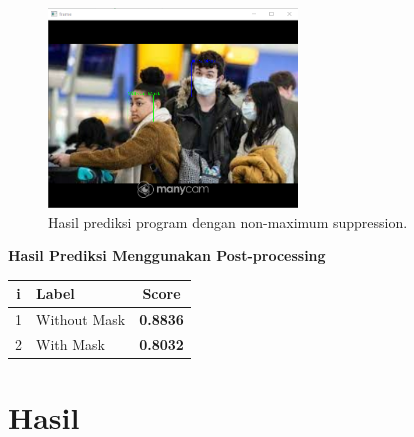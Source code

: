 \documentclass{article}
\begin{document}
	\begin{figure}[H]
		\centering
		\includegraphics[width=250px]{../demo/Results/implementation/with_nms0.png}
		\caption{Hasil prediksi program dengan non-maximum suppression.}
  	\end{figure}
	{\large{\textbf{Hasil Prediksi Menggunakan Post-processing}}}
	\begin{table}[H]
		\centering
		\begin{tabular}{clc}
			\hline
			\textbf{i} & \textbf{Label}               & \textbf{Score}  \\ \hline
			1 & Without Mask        & \textbf{0.8836} \\
			2 & With Mask           & \textbf{0.8032} \\
		\end{tabular}
	\end{table}
  
  \section{Hasil}
\end{document}
